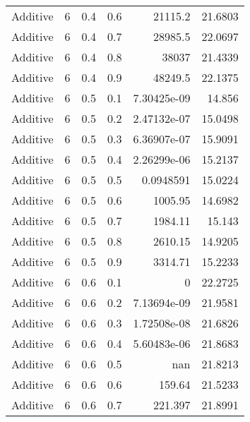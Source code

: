 \documentclass{article}
\begin{document}
\begin{longtable}[H]{lrrrrr}
 Additive       &       6 &   0.4 &            0.6 &  21115.2         &         21.6803 \\
 Additive       &       6 &   0.4 &            0.7 &  28985.5         &         22.0697 \\
 Additive       &       6 &   0.4 &            0.8 &  38037           &         21.4339 \\
 Additive       &       6 &   0.4 &            0.9 &  48249.5         &         22.1375 \\
 Additive       &       6 &   0.5 &            0.1 &      7.30425e-09 &         14.856  \\
 Additive       &       6 &   0.5 &            0.2 &      2.47132e-07 &         15.0498 \\
 Additive       &       6 &   0.5 &            0.3 &      6.36907e-07 &         15.9091 \\
 Additive       &       6 &   0.5 &            0.4 &      2.26299e-06 &         15.2137 \\
 Additive       &       6 &   0.5 &            0.5 &      0.0948591   &         15.0224 \\
 Additive       &       6 &   0.5 &            0.6 &   1005.95        &         14.6982 \\
 Additive       &       6 &   0.5 &            0.7 &   1984.11        &         15.143  \\
 Additive       &       6 &   0.5 &            0.8 &   2610.15        &         14.9205 \\
 Additive       &       6 &   0.5 &            0.9 &   3314.71        &         15.2233 \\
 Additive       &       6 &   0.6 &            0.1 &      0           &         22.2725 \\
 Additive       &       6 &   0.6 &            0.2 &      7.13694e-09 &         21.9581 \\
 Additive       &       6 &   0.6 &            0.3 &      1.72508e-08 &         21.6826 \\
 Additive       &       6 &   0.6 &            0.4 &      5.60483e-06 &         21.8683 \\
 Additive       &       6 &   0.6 &            0.5 &    nan           &         21.8213 \\
 Additive       &       6 &   0.6 &            0.6 &    159.64        &         21.5233 \\
 Additive       &       6 &   0.6 &            0.7 &    221.397       &         21.8991 \\

\end{longtable}
\end{document}
